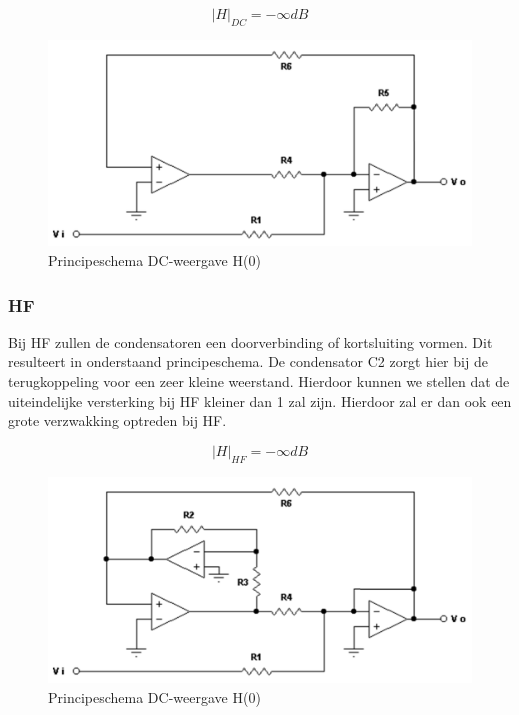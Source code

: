 \documentclass[]{article}
\begin{document}
\begin{equation*}
\boxed{|H|_{DC} = -\infty dB}
\end{equation*}

\begin{figure}[H]
	\centering
	\includegraphics[scale=0.35]{schema_DC}
	\caption{Principeschema DC-weergave H(0)}
	\label{fig:schema_DC}
\end{figure}

\subsubsection*{HF}

Bij HF zullen de condensatoren een doorverbinding of kortsluiting vormen. Dit
resulteert in onderstaand principeschema. De condensator C2 zorgt hier bij de
terugkoppeling voor een zeer kleine weerstand. Hierdoor kunnen we stellen dat
de uiteindelijke versterking bij HF kleiner dan 1 zal zijn. Hierdoor zal er dan
ook een grote verzwakking optreden bij HF.

\begin{equation*}
	\boxed{|H|_{HF} = -\infty dB}
\end{equation*}


\begin{figure}[H]
	\centering
	\includegraphics[scale=0.35]{schema_hf}
	\caption{Principeschema DC-weergave H(0)}
	\label{fig:schema_HF}
\end{figure}
\end{document}
